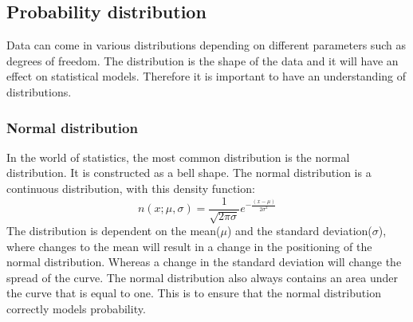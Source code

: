 \subsection{Probability distribution}
Data can come in various distributions depending on different parameters such
as degrees of freedom. The distribution is the shape of the data and it will have
an effect on statistical models. Therefore it is important to have an understanding of distributions.
\subsubsection{Normal distribution}
In the world of statistics, the most common distribution is the normal distribution. It is constructed as a bell shape. The normal distribution is a continuous distribution, with this density function:
$$n(x;\mu,\sigma) =\frac{1}{\sqrt{2\pi\sigma}}e^{-\frac{(x-\mu)}{2\sigma^2}}$$
The distribution is dependent on the mean($\mu$) and the standard deviation($\sigma$), where changes to the mean will result in a change in the positioning of the normal distribution. Whereas a change in the standard deviation will change the spread of the curve. The normal distribution also always contains an area under the curve that is equal to one. This is to ensure that the normal distribution correctly models probability.

